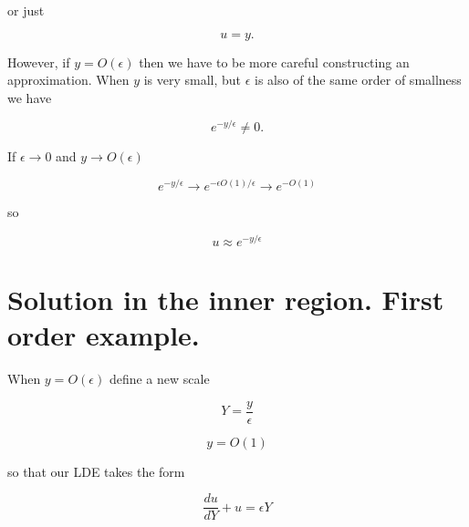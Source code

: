 or just

\begin{equation}\label{eqn:continuumL20:n}
u = y.
\end{equation}

However, if $y = O(\epsilon)$ then we have to be more careful constructing an approximation.  When $y$ is very small, but $\epsilon$ is also of the same order of smallness we have

%
%
%
%
%
\begin{equation}\label{eqn:continuumL20:130}
e^{-y/\epsilon} \ne 0.
\end{equation}

If $\epsilon \rightarrow 0$ and $y \rightarrow O(\epsilon)$

\begin{equation}\label{eqn:continuumL20:150}
e^{-y/\epsilon} \rightarrow e^{-\epsilon O(1) /\epsilon} \rightarrow e^{-O(1)}
\end{equation}

so 

\begin{equation}\label{eqn:continuumL20:170}
u \approx e^{-y/\epsilon}
\end{equation}


\section{Solution in the inner region.  First order example.}

When $y = O(\epsilon)$ define a new scale

\begin{equation}\label{eqn:continuumL20:190}
Y = \frac{y}{\epsilon}
\end{equation}

\begin{equation}\label{eqn:continuumL20:210}
y = O(1)
\end{equation}

so that our LDE takes the form

\begin{equation}\label{eqn:continuumL20:230}
\frac{du}{dY} + u = \epsilon Y
\end{equation}

